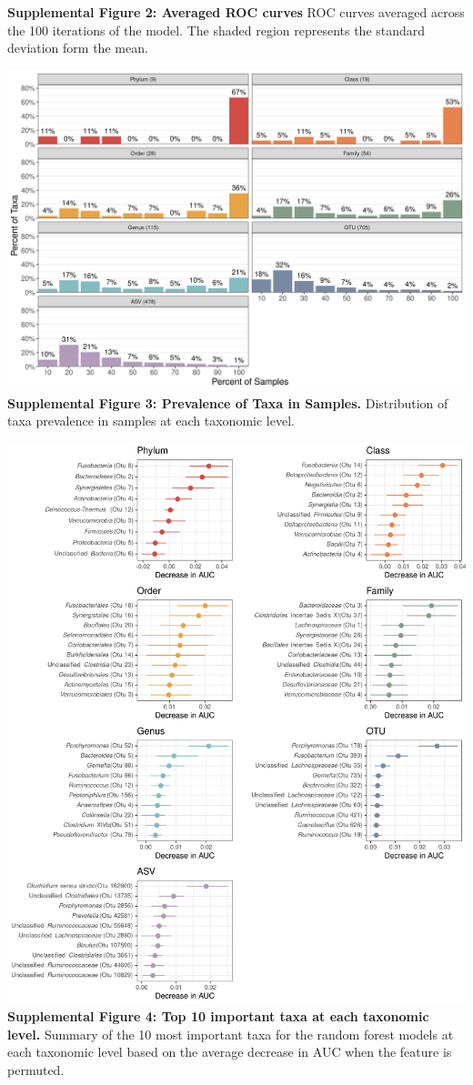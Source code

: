 \documentclass[
]{article}
\begin{document}
\textbf{Supplemental Figure 2: Averaged ROC curves} ROC curves averaged
across the 100 iterations of the model. The shaded region represents the
standard deviation form the mean.

\newpage

\includegraphics[width=\textwidth,height=0.45\textheight]{figure_s3.png}\\
\textbf{Supplemental Figure 3: Prevalence of Taxa in Samples.}
Distribution of taxa prevalence in samples at each taxonomic level.

\newpage

\includegraphics[width=\textwidth,height=0.85\textheight]{figure_s4.png}\\
\textbf{Supplemental Figure 4: Top 10 important taxa at each taxonomic
level.} Summary of the 10 most important taxa for the random forest
models at each taxonomic level based on the average decrease in AUC when
the feature is permuted.
\end{document}
